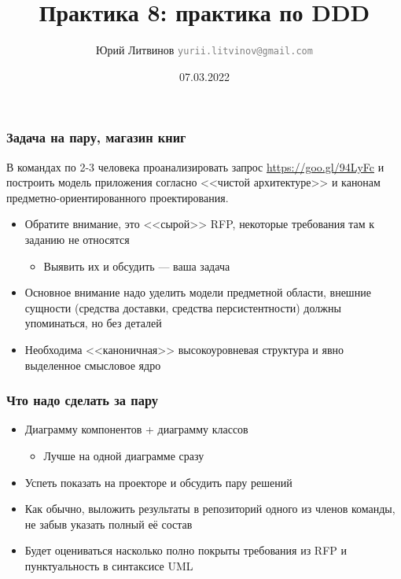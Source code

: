 \documentclass[xetex,mathserif,serif]{beamer}
\title{Практика 8: практика по DDD}
\author[Юрий Литвинов]{Юрий Литвинов \newline \textcolor{gray}{\small\texttt{yurii.litvinov@gmail.com}}}
\date{07.03.2022}
\begin{document}
    
    \frame{\titlepage}

    \begin{frame}
        \frametitle{Задача на пару, магазин книг}
        В командах по 2-3 человека проанализировать запрос \url{ https://goo.gl/94LyFc} и построить модель приложения согласно <<чистой архитектуре>> и канонам предметно-ориентированного проектирования.
        \begin{itemize}
            \item Обратите внимание, это <<сырой>> RFP, некоторые требования там к заданию не относятся
            \begin{itemize}
                \item Выявить их и обсудить --- ваша задача
            \end{itemize}
            \item Основное внимание надо уделить модели предметной области, внешние сущности (средства доставки, средства персистентности) должны упоминаться, но без деталей
            \item Необходима <<каноничная>> высокоуровневая структура и явно выделенное смысловое ядро
        \end{itemize}
    \end{frame}

    \begin{frame}
        \frametitle{Что надо сделать за пару}
        \begin{itemize}
            \item Диаграмму компонентов + диаграмму классов
            \begin{itemize}
                \item Лучше на одной диаграмме сразу
            \end{itemize}
            \item Успеть показать на проекторе и обсудить пару решений
            \item Как обычно, выложить результаты в репозиторий одного из членов команды, не забыв указать полный её состав
            \item Будет оцениваться насколько полно покрыты требования из RFP и пунктуальность в синтаксисе UML
        \end{itemize}
    \end{frame}
\end{document}
